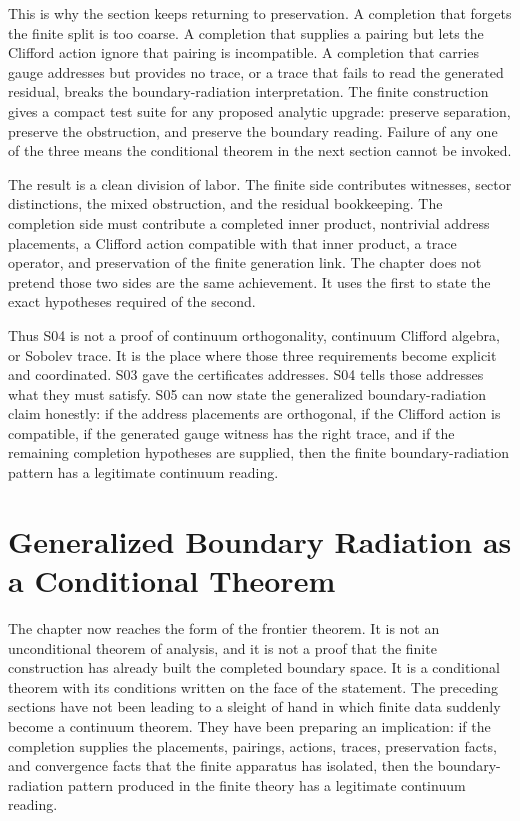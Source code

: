 This is why the section keeps returning to preservation. A completion that
forgets the finite split is too coarse. A completion that supplies a pairing
but lets the Clifford action ignore that pairing is incompatible. A completion
that carries gauge addresses but provides no trace, or a trace that fails to
read the generated residual, breaks the boundary-radiation interpretation. The
finite construction gives a compact test suite for any proposed analytic
upgrade: preserve separation, preserve the obstruction, and preserve the
boundary reading. Failure of any one of the three means the conditional theorem
in the next section cannot be invoked.

The result is a clean division of labor. The finite side contributes witnesses,
sector distinctions, the mixed obstruction, and the residual bookkeeping. The
completion side must contribute a completed inner product, nontrivial address
placements, a Clifford action compatible with that inner product, a trace
operator, and preservation of the finite generation link. The chapter does not
pretend those two sides are the same achievement. It uses the first to state
the exact hypotheses required of the second.

Thus S04 is not a proof of continuum orthogonality, continuum Clifford algebra,
or Sobolev trace. It is the place where those three requirements become
explicit and coordinated. S03 gave the certificates addresses. S04 tells those
addresses what they must satisfy. S05 can now state the generalized
boundary-radiation claim honestly: if the address placements are orthogonal, if
the Clifford action is compatible, if the generated gauge witness has the
right trace, and if the remaining completion hypotheses are supplied, then the
finite boundary-radiation pattern has a legitimate continuum reading.

\section{Generalized Boundary Radiation as a Conditional Theorem}

The chapter now reaches the form of the frontier theorem. It is not an
unconditional theorem of analysis, and it is not a proof that the finite
construction has already built the completed boundary space. It is a conditional
theorem with its conditions written on the face of the statement. The preceding
sections have not been leading to a sleight of hand in which finite data suddenly
become a continuum theorem. They have been preparing an implication: if the
completion supplies the placements, pairings, actions, traces, preservation
facts, and convergence facts that the finite apparatus has isolated, then the
boundary-radiation pattern produced in the finite theory has a legitimate
continuum reading.

